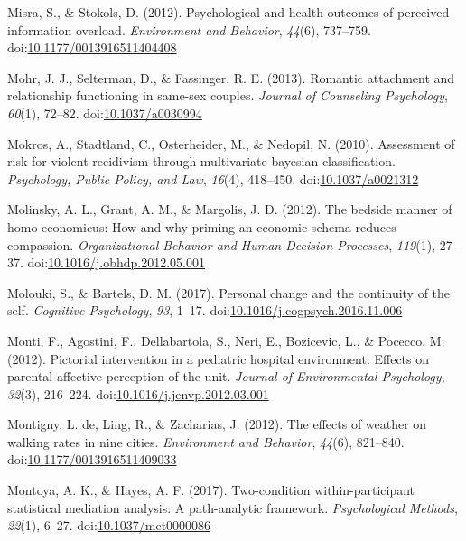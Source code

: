 \documentclass[english,man]{apa6}
\theoremstyle{definition}
\theoremstyle{definition}
\theoremstyle{definition}
\theoremstyle{remark}
\begin{document}
\hypertarget{ref-Misra2012}{}
Misra, S., \& Stokols, D. (2012). Psychological and health outcomes of
perceived information overload. \emph{Environment and Behavior},
\emph{44}(6), 737--759.
doi:\href{https://doi.org/10.1177/0013916511404408}{10.1177/0013916511404408}

\hypertarget{ref-Mohr2013}{}
Mohr, J. J., Selterman, D., \& Fassinger, R. E. (2013). Romantic
attachment and relationship functioning in same-sex couples.
\emph{Journal of Counseling Psychology}, \emph{60}(1), 72--82.
doi:\href{https://doi.org/10.1037/a0030994}{10.1037/a0030994}

\hypertarget{ref-Mokros2010}{}
Mokros, A., Stadtland, C., Osterheider, M., \& Nedopil, N. (2010).
Assessment of risk for violent recidivism through multivariate bayesian
classification. \emph{Psychology, Public Policy, and Law}, \emph{16}(4),
418--450. doi:\href{https://doi.org/10.1037/a0021312}{10.1037/a0021312}

\hypertarget{ref-Molinsky2012}{}
Molinsky, A. L., Grant, A. M., \& Margolis, J. D. (2012). The bedside
manner of homo economicus: How and why priming an economic schema
reduces compassion. \emph{Organizational Behavior and Human Decision
Processes}, \emph{119}(1), 27--37.
doi:\href{https://doi.org/10.1016/j.obhdp.2012.05.001}{10.1016/j.obhdp.2012.05.001}

\hypertarget{ref-Molouki2017}{}
Molouki, S., \& Bartels, D. M. (2017). Personal change and the
continuity of the self. \emph{Cognitive Psychology}, \emph{93}, 1--17.
doi:\href{https://doi.org/10.1016/j.cogpsych.2016.11.006}{10.1016/j.cogpsych.2016.11.006}

\hypertarget{ref-Monti2012}{}
Monti, F., Agostini, F., Dellabartola, S., Neri, E., Bozicevic, L., \&
Pocecco, M. (2012). Pictorial intervention in a pediatric hospital
environment: Effects on parental affective perception of the unit.
\emph{Journal of Environmental Psychology}, \emph{32}(3), 216--224.
doi:\href{https://doi.org/10.1016/j.jenvp.2012.03.001}{10.1016/j.jenvp.2012.03.001}

\hypertarget{ref-DeMontigny2012}{}
Montigny, L. de, Ling, R., \& Zacharias, J. (2012). The effects of
weather on walking rates in nine cities. \emph{Environment and
Behavior}, \emph{44}(6), 821--840.
doi:\href{https://doi.org/10.1177/0013916511409033}{10.1177/0013916511409033}

\hypertarget{ref-Montoya2017}{}
Montoya, A. K., \& Hayes, A. F. (2017). Two-condition within-participant
statistical mediation analysis: A path-analytic framework.
\emph{Psychological Methods}, \emph{22}(1), 6--27.
doi:\href{https://doi.org/10.1037/met0000086}{10.1037/met0000086}
\end{document}

